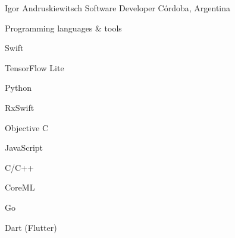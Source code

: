 \documentclass{curriculum}
\begin{document}

\begin{cvheader}

\makeheader
    {Igor Andruskiewitsch}  {}
    {Software Developer}    {}
    {Córdoba, Argentina}    {}

\end{cvheader}


\begin{cvsection}{Programming languages \& tools}
    \begin{colsectionitemlist}{5}

    \item{Swift}
    \item{TensorFlow Lite}
    \item{Python}
    \item{RxSwift}
    \item{Objective C}
    \item{JavaScript}
    \item{C/C++}
    \item{CoreML}
    \item{Go}
    \item{Dart (Flutter)}

    \end{colsectionitemlist}
\end{cvsection}

\end{document}
